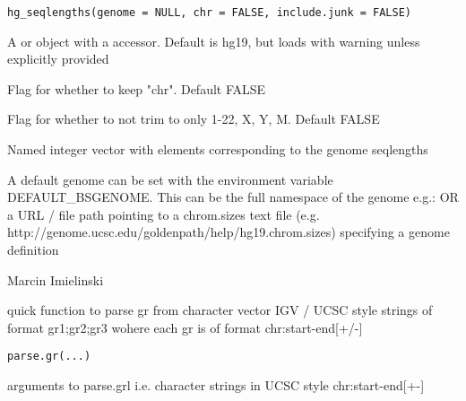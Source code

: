 \documentclass[a4paper]{book}
\begin{document}
%
\begin{Usage}
\begin{verbatim}
hg_seqlengths(genome = NULL, chr = FALSE, include.junk = FALSE)
\end{verbatim}
\end{Usage}
%
\begin{Arguments}
\begin{ldescription}
\item[\code{genome}] A  or object with a  accessor. Default is hg19, but loads with warning unless explicitly provided

\item[\code{chr}] Flag for whether to keep "chr". Default FALSE

\item[\code{include.junk}] Flag for whether to not trim to only 1-22, X, Y, M. Default FALSE
\end{ldescription}
\end{Arguments}
%
\begin{Value}
Named integer vector with elements corresponding to the genome seqlengths
\end{Value}
%
\begin{Note}\relax
A default genome can be set with the environment variable DEFAULT\_BSGENOME. This
can be the full namespace of the genome  e.g.:  OR  a URL / file path pointing to a chrom.sizes text file (e.g. http://genome.ucsc.edu/goldenpath/help/hg19.chrom.sizes) specifying a genome definition
\end{Note}
%
\begin{Author}\relax
Marcin Imielinski
\end{Author}
%
\begin{Description}\relax
quick function to parse gr from character vector IGV / UCSC style strings of format gr1;gr2;gr3 wohere each gr is of format chr:start-end[+/-]
\end{Description}
%
\begin{Usage}
\begin{verbatim}
parse.gr(...)
\end{verbatim}
\end{Usage}
%
\begin{Arguments}
\begin{ldescription}
\item[\code{...}] arguments to parse.grl i.e. character strings in UCSC style chr:start-end[+-]
\end{ldescription}
\end{Arguments}
\end{document}
